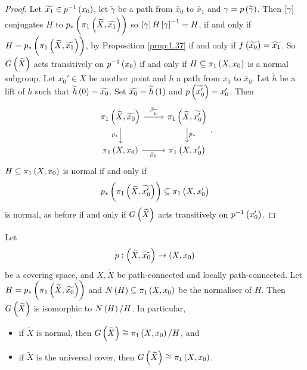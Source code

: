 \pagebreak

\begin{proof}
Let $ \widetilde{x_1} \in p^{-1}\br{x_0} $, let $ \widetilde{\gamma} $ be a path from $ \widetilde{x_0} $ to $ \widetilde{x_1} $ and $ \gamma = p\br{\widetilde{\gamma}} $. Then $ \sbr{\gamma} $ conjugates $ H $ to $ p_*\br{\pi_1\br{\widetilde{X}, \widetilde{x_1}}} $ so $ \sbr{\gamma}H\sbr{\gamma}^{-1} = H $, if and only if $ H = p_*\br{\pi_1\br{\widetilde{X}, \widetilde{x_1}}} $, by Proposition \ref{prop:1.37} if and only if $ f\br{\widetilde{x_0}} = \widetilde{x_1} $. So $ G\br{\widetilde{X}} $ acts transitively on $ p^{-1}\br{x_0} $ if and only if $ H \subseteq \pi_1\br{X, x_0} $ is a normal subgroup. Let $ x_0' \in X $ be another point and $ h $ a path from $ x_0 $ to $ \widetilde{x_0} $. Let $ \widetilde{h} $ be a lift of $ h $ such that $ \widetilde{h}\br{0} = \widetilde{x_0} $. Set $ \widetilde{x_0} = \widetilde{h}\br{1} $ and $ p\br{\widetilde{x_0'}} = x_0' $. Then
$$
\begin{tikzcd}
\pi_1\br{\widetilde{X}, \widetilde{x_0}} \arrow{r}{\beta_{\widetilde{h}}} \arrow[swap]{d}{p_*} & \pi_1\br{\widetilde{X}, \widetilde{x_0'}} \arrow{d}{p_*} \\
\pi_1\br{X, x_0} \arrow[swap]{r}{\beta_h} & \pi_1\br{X, x_0'}
\end{tikzcd}.
$$
$ H \subseteq \pi_1\br{X, x_0} $ is normal if and only if
$$ p_*\br{\pi_1\br{\widetilde{X}, \widetilde{x_0'}}} \subseteq \pi_1\br{X, x_0'} $$ is normal, as before if and only if $ G\br{\widetilde{X}} $ acts transitively on $ p^{-1}\br{x_0'} $.
\end{proof}


\begin{proposition}
Let
$$ p : \br{\widetilde{X}, \widetilde{x_0}} \to \br{X, x_0} $$
be a covering space, and $ X, \widetilde{X} $ be path-connected and locally path-connected. Let $ H = p_*\br{\pi_1\br{\widetilde{X}, \widetilde{x_0}}} $ and $ N\br{H} \subseteq \pi_1\br{X, x_0} $ be the normaliser of $ H $. Then $ G\br{\widetilde{X}} $ is isomorphic to $ N\br{H} / H $. In particular,
\begin{itemize}
\item if $ \widetilde{X} $ is normal, then $ G\br{\widetilde{X}} \cong \pi_1\br{X, x_0} / H $, and
\item if $ \widetilde{X} $ is the universal cover, then $ G\br{\widetilde{X}} \cong \pi_1\br{X, x_0} $.
\end{itemize}
\end{proposition}

